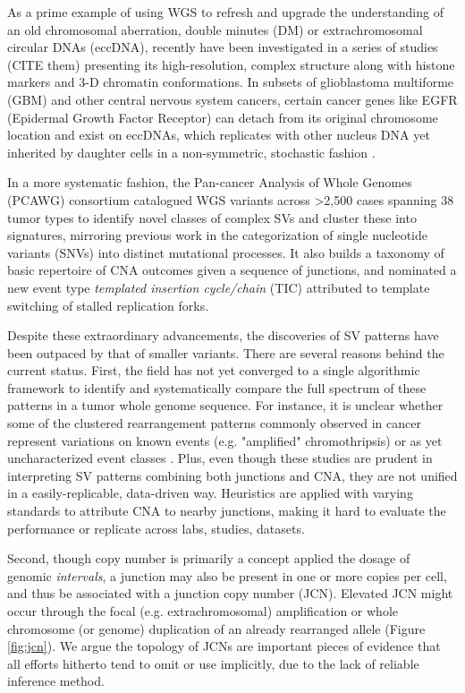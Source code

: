 \documentclass[phd,tocprelim]{cornell}
\begin{document}
As a prime example of using WGS to refresh and upgrade the understanding of an old chromosomal aberration, double minutes (DM) or extrachromosomal circular DNAs (eccDNA), recently have been investigated in a series of studies (CITE them) presenting its high-resolution, complex structure along with histone markers and 3-D chromatin conformations. In subsets of glioblastoma multiforme (GBM) and other central nervous system cancers, certain cancer genes like EGFR (Epidermal Growth Factor Receptor) can detach from its original chromosome location and exist on eccDNAs, which replicates with other nucleus DNA yet inherited by daughter cells in a non-symmetric, stochastic fashion \cite{Gaubatz1990-da}. 

In a more systematic fashion, the Pan-cancer Analysis of Whole Genomes (PCAWG) consortium catalogued WGS variants across >2,500 cases spanning 38 tumor types\cite{pcawg_marker2020-yi} to identify novel classes of complex SVs and cluster these into signatures, mirroring previous work in the categorization of single nucleotide variants (SNVs) into distinct mutational processes\cite{Li2020-ds,Alexandrov2013-zv,Nik-Zainal2012-dc,Menghi2018-er}. It also builds a taxonomy of basic repertoire of CNA outcomes given a sequence of junctions, and nominated a new event type \textit{templated insertion cycle/chain} (TIC) attributed to template switching of stalled replication forks.

Despite these extraordinary advancements, the discoveries of SV patterns have been outpaced by that of smaller variants. There are several reasons behind the current status. First, the field has not yet converged to a single algorithmic framework to identify and systematically compare the full spectrum of these patterns in a tumor whole genome sequence. For instance, it is unclear whether some of the clustered rearrangement patterns commonly observed in cancer represent variations on known events (e.g. "amplified" chromothripsis) or as yet uncharacterized event classes \cite{pcawg_marker2020-yi, Li2020sv}. Plus, even though these studies are prudent in interpreting SV patterns combining both junctions and CNA, they are not unified in a easily-replicable, data-driven way. Heuristics are applied with varying standards to attribute CNA to nearby junctions, making it hard to evaluate the performance or replicate across labs, studies, datasets.

Second, though copy number is primarily a concept applied the dosage of genomic \textit{intervals}, a junction may also be present in one or more copies per cell, and thus be associated with a junction copy number (JCN). Elevated JCN might occur through the focal (e.g. extrachromosomal) amplification \cite{Verhaak2019,Wu2019-ap} or whole chromosome (or genome) duplication of an already rearranged allele (Figure \ref{fig:jcn}). We argue the topology of JCNs are important pieces of evidence that all efforts hitherto tend to omit or use implicitly, due to the lack of reliable inference method.
\end{document}
